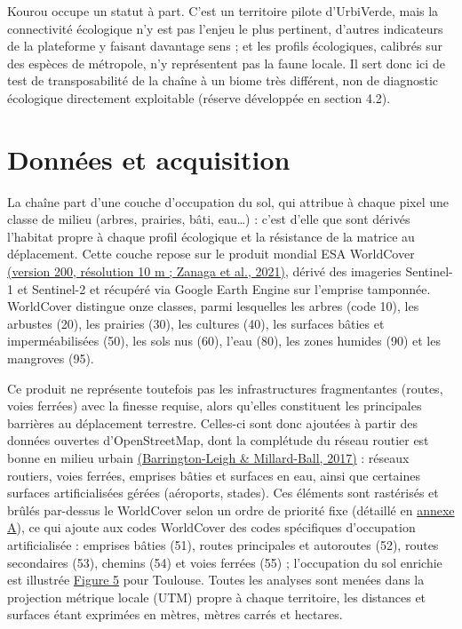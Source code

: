 \documentclass[a4paper,11pt]{report}
\begin{document}
Kourou occupe un statut à part. C'est un territoire pilote d'UrbiVerde, mais la connectivité écologique n'y est pas l'enjeu le plus pertinent, d'autres indicateurs de la plateforme y faisant davantage sens ; et les profils écologiques, calibrés sur des espèces de métropole, n'y représentent pas la faune locale. Il sert donc ici de test de transposabilité de la chaîne à un biome très différent, non de diagnostic écologique directement exploitable (réserve développée en section 4.2).

\section{Données et acquisition}\label{sec:2.2}

La chaîne part d'une couche d'occupation du sol, qui attribue à chaque pixel une classe de milieu (arbres, prairies, bâti, eau\ldots{}) : c'est d'elle que sont dérivés l'habitat propre à chaque profil écologique et la résistance de la matrice au déplacement. Cette couche repose sur le produit mondial ESA WorldCover \hyperref[sec:bibliographie]{(version 200, résolution 10 m ; Zanaga et al., 2021)}, dérivé des imageries Sentinel-1 et Sentinel-2 et récupéré via Google Earth Engine sur l'emprise tamponnée. WorldCover distingue onze classes, parmi lesquelles les arbres (code 10), les arbustes (20), les prairies (30), les cultures (40), les surfaces bâties et imperméabilisées (50), les sols nus (60), l'eau (80), les zones humides (90) et les mangroves (95).

Ce produit ne représente toutefois pas les infrastructures fragmentantes (routes, voies ferrées) avec la finesse requise, alors qu'elles constituent les principales barrières au déplacement terrestre. Celles-ci sont donc ajoutées à partir des données ouvertes d'OpenStreetMap, dont la complétude du réseau routier est bonne en milieu urbain \hyperref[sec:bibliographie]{(Barrington-Leigh \& Millard-Ball, 2017)} : réseaux routiers, voies ferrées, emprises bâties et surfaces en eau, ainsi que certaines surfaces artificialisées gérées (aéroports, stades). Ces éléments sont rastérisés et brûlés par-dessus le WorldCover selon un ordre de priorité fixe (détaillé en \hyperref[annexe:A]{annexe A}), ce qui ajoute aux codes WorldCover des codes spécifiques d'occupation artificialisée : emprises bâties (51), routes principales et autoroutes (52), routes secondaires (53), chemins (54) et voies ferrées (55) ; l'occupation du sol enrichie est illustrée \hyperref[fig:5]{Figure 5} pour Toulouse. Toutes les analyses sont menées dans la projection métrique locale (UTM) propre à chaque territoire, les distances et surfaces étant exprimées en mètres, mètres carrés et hectares.
\end{document}
